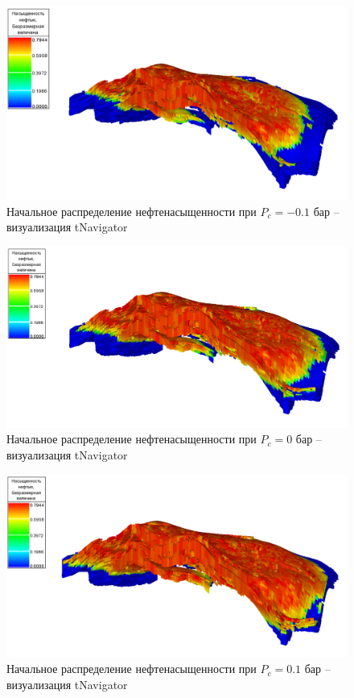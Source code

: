 \documentclass[a4paper,12pt]{article}
\begin{document}
\begin{figure}[H]
\center
\includegraphics[width=\textwidth]{saturation_1_model_1}
\caption{Начальное распределение нефтенасыщенности при $P_c=-0.1$ бар -- визуализация tNavigator}
\label{fig:saturation_1_model_1}
\end{figure}

\begin{figure}[H]
\center
\includegraphics[width=\textwidth]{saturation_2_model_1}
\caption{Начальное распределение нефтенасыщенности при $P_c=0$ бар -- визуализация tNavigator}
\label{fig:saturation_2_model_1}
\end{figure}

\begin{figure}[H]
\center
\includegraphics[width=\textwidth]{saturation_3_model_1}
\caption{Начальное распределение нефтенасыщенности при $P_c=0.1$ бар -- визуализация tNavigator}
\label{fig:saturation_3_model_1}
\end{figure}
\end{document}
